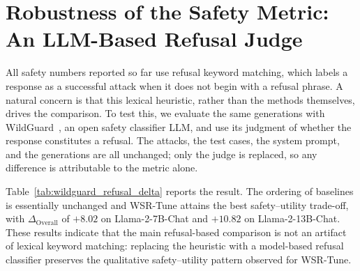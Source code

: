 \documentclass{article}
\begin{document}








\FloatBarrier




\section{Robustness of the Safety Metric: An LLM-Based Refusal Judge}
\label{sec:wildguard_judge}



All safety numbers reported so far use refusal keyword matching, which labels a response as a successful attack when it does not begin with a refusal phrase. A natural concern is that this lexical heuristic, rather than the methods themselves, drives the comparison. To test this, we evaluate the same generations with WildGuard~\citep{wildguard}, an open safety classifier LLM, and use its judgment of whether the response constitutes a refusal. The attacks, the test cases, the system prompt, and the generations are all unchanged; only the judge is replaced, so any difference is attributable to the metric alone.

Table~\ref{tab:wildguard_refusal_delta} reports the result. The ordering of baselines is essentially unchanged and WSR-Tune attains the best safety--utility trade-off, with $\Delta_{\mathrm{Overall}}$ of $+8.02$ on Llama-2-7B-Chat and $+10.82$ on Llama-2-13B-Chat. These results indicate that the main refusal-based comparison is not an artifact of lexical keyword matching: replacing the heuristic with a model-based refusal classifier preserves the qualitative safety--utility pattern observed for WSR-Tune.
\end{document}
